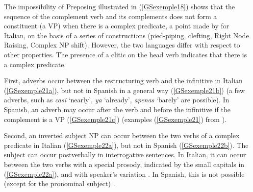 \documentclass[output=paper
	        ,collection
	        ,collectionchapter
 	        ,biblatex
                ,babelshorthands
                ,newtxmath
                ,draftmode
                ,colorlinks, citecolor=brown
]{langscibook}
\begin{document}
{The impossibility of Preposing illustrated in (\ref{GSexemple18}) shows that the sequence of the complement verb and its complements does not form a constituent (a VP) when there is a complex predicate, a point made by \cite{rizzi1982issues} for Italian, on the basis of a series of constructions (pied-piping, clefting, Right Node Raising, Complex NP shift). However, the two languages differ with respect to other properties. The presence of a clitic on the head verb indicates that there is a complex predicate.
 
First, adverbs occur between the restructuring verb and the infinitive in Italian (\ref{GSexemple21a}), but not in Spanish in a general way (\ref{GSexemple21b}) (a few adverbs, such as \emph{casi} `nearly', \emph{ya} `already', \emph{apenas} `barely' are possible). In Spanish, an adverb may occur after the verb and before the infinitive if the complement is a VP (\ref{GSexemple21c}) (examples (\ref{GSexemple21}) from \citealt[139]{AG2010}).

\eal
	\label{GSexemple21} 
	\label{GSexemple21a}

	\label{GSexemple21b}		
	
	\label{GSexemple21c}	
\zl

Second, an inverted subject NP can occur between the two verbs of a complex predicate in Italian (\ref{GSexemple22a}), but not in Spanish (\ref{GSexemple22b}). The subject can occur postverbally in interrogative sentences. In Italian, it can occur between the two verbs with a special prosody, indicated by the small capitals in (\ref{GSexemple22a}), and with speaker’s variation \citep{salvi1980ausiliari}. In Spanish, this is not possible (except for the pronominal subject) \citep{suner1982syntax}.

\eal
	\label{GSexemple22} 
	\label{GSexemple22a}

}
\end{document}
